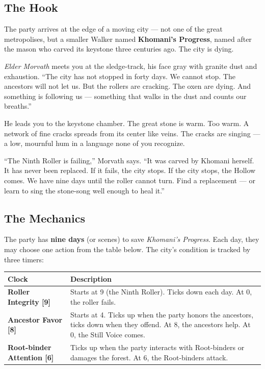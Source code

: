 \clearpage
\begin{tcolorbox}[colback=black!3,colframe=green!60!black,title={The Nine Rollers: A City on the Edge},breakable]

  \subsection*{The Hook}
  
  The party arrives at the edge of a moving city --- not one of the great metropolises, but a smaller Walker named \textbf{Khomani's Progress}, named after the mason who carved its keystone three centuries ago. The city is dying.
  
  \textit{Elder Morvath} meets you at the sledge-track, his face gray with granite dust and exhaustion. ``The city has not stopped in forty days. We cannot stop. The ancestors will not let us. But the rollers are cracking. The oxen are dying. And something is following us --- something that walks in the dust and counts our breaths.''
  
  He leads you to the keystone chamber. The great stone is warm. Too warm. A network of fine cracks spreads from its center like veins. The cracks are singing --- a low, mournful hum in a language none of you recognize.
  
  ``The Ninth Roller is failing,'' Morvath says. ``It was carved by Khomani herself. It has never been replaced. If it fails, the city stops. If the city stops, the Hollow comes. We have nine days until the roller cannot turn. Find a replacement --- or learn to sing the stone-song well enough to heal it.''
  
  \vspace{2mm}
  \subsection*{The Mechanics}
  
  The party has \textbf{nine days} (or scenes) to save \textit{Khomani's Progress}. Each day, they may choose one action from the table below. The city's condition is tracked by three timers:
  
  \begin{longtable}{|p{}|p{}|}
  \hline
  \textbf{Clock} & \textbf{Description} \\
  \hline
  \textbf{Roller Integrity [9]} & Starts at 9 (the Ninth Roller). Ticks down each day. At 0, the roller fails. \\
  \hline
  \textbf{Ancestor Favor [8]} & Starts at 4. Ticks up when the party honors the ancestors, ticks down when they offend. At 8, the ancestors help. At 0, the Still Voice comes. \\
  \hline
  \textbf{Root-binder Attention [6]} & Ticks up when the party interacts with Root-binders or damages the forest. At 6, the Root-binders attack. \\
  \hline
  \end{longtable}
  

\end{tcolorbox}

